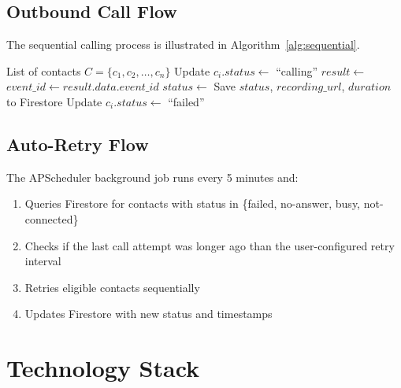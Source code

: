 \documentclass[12pt,a4paper,oneside]{book}
\begin{document}
\subsection{Outbound Call Flow}
The sequential calling process is illustrated in Algorithm~\ref{alg:sequential}.

\begin{algorithm}[H]
\caption{Sequential Automated Calling}
\label{alg:sequential}
\begin{algorithmic}[1]
\Require List of contacts $C = \{c_1, c_2, \ldots, c_n\}$
    \State Update $c_i.status \gets$ ``calling''
    \State $result \gets$ 
        \State $event\_id \gets result.data.event\_id$
        \Repeat
            \State {}
            \State $status \gets$ 
        \State Save $status$, $recording\_url$, $duration$ to Firestore
    \Else
        \State Update $c_i.status \gets$ ``failed''
    \EndIf
    \State {} 
\EndFor
\end{algorithmic}
\end{algorithm}

\subsection{Auto-Retry Flow}

The APScheduler background job runs every 5 minutes and:
\begin{enumerate}
    \item Queries Firestore for contacts with status in \{failed, no-answer, busy, not-connected\}
    \item Checks if the last call attempt was longer ago than the user-configured retry interval
    \item Retries eligible contacts sequentially
    \item Updates Firestore with new status and timestamps
\end{enumerate}

\section{Technology Stack}
\end{document}
